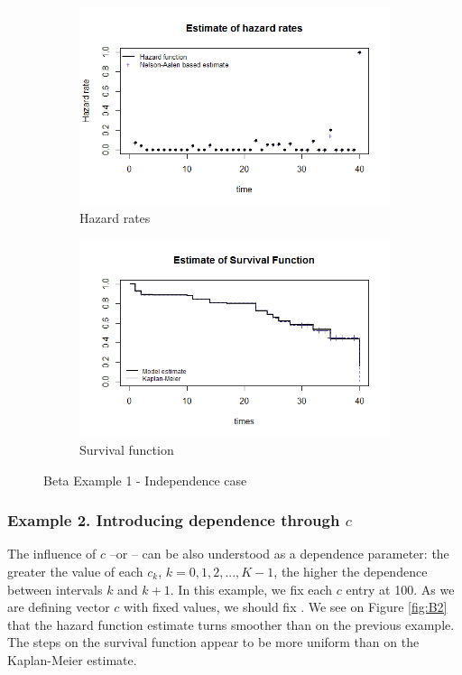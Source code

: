 \documentclass[letterpaper]{article}\usepackage[]{graphicx}\usepackage[]{color}
\begin{document}
\begin{figure}
  \centering
  \begin{subfigure}[a]{\textwidth}\centering
    \includegraphics[width=\textwidth]{B11.png}
    \caption{Hazard rates}
  \end{subfigure}
  \begin{subfigure}[b]{\textwidth}\centering
    \includegraphics[width=\textwidth]{B12.png}
    \caption{Survival function}
  \end{subfigure}
  \caption{Beta Example 1 - Independence case}
  \label{fig:B1}
\end{figure}
 
\subsubsection{Example 2. Introducing dependence through $c$}

The influence of $c$ --or -- can be also understood as a dependence parameter: the greater the value of each $c_k$, $k=0,1,2,...,K-1$, the higher the dependence between intervals $k$ and $k+1$. In this example, we fix each $c$ entry at 100. As we are defining vector $c$ with fixed values, we should fix . We see on Figure \ref{fig:B2} that the hazard function estimate turns smoother than on the previous example. The steps on the survival function appear to be more uniform than on the Kaplan-Meier estimate. 
 
\end{document}
